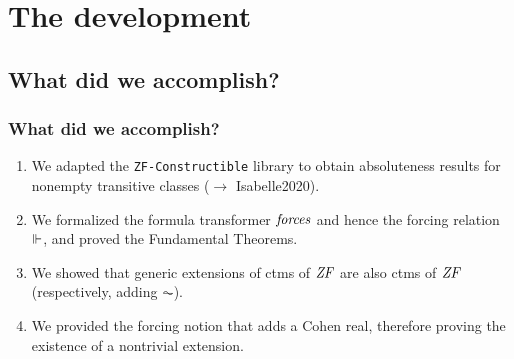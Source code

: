 \documentclass[english]{beamer}
\begin{document}
\section{The development}

\subsection{What did we accomplish?}

\begin{frame}
  \frametitle{What did we accomplish?}
  \begin{shadowblock}{}
    \begin{enumerate}
    \item<1-> We adapted the \texttt{ZF-Constructible} library
      \citep{paulson_2003} to obtain
      absoluteness results for nonempty transitive classes ($\to$
      \alert{Isabelle2020}).
    \item<2-> We formalized the formula transformer $\mathit{forces}$ and
      hence the forcing relation $\Vdash$, and proved the Fundamental
      Theorems.
    \item<3-> We showed that generic extensions of ctms of $\mathit{ZF}$ are also
      ctms of $\mathit{ZF}$ (respectively, adding $\AC$).
    \item<4-> We provided the forcing notion that adds a Cohen real,
      therefore proving the existence of a nontrivial extension.
    \end{enumerate}
  \end{shadowblock}
\end{frame}
\end{document}

